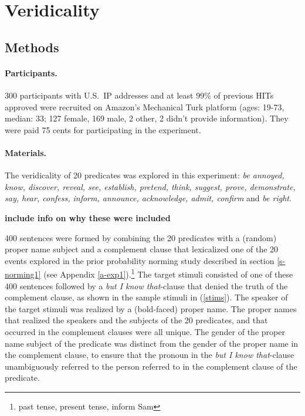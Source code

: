 \documentclass[11pt,fleqn]{article}
\newcommand{\6}{\mbox{$[\hspace*{-.6mm}[$}}
\newcommand{\9}{\mbox{$]\hspace*{-.6mm}]$}}
\begin{document}
\section{Veridicality}\label{s-norming2}

\subsection{Methods}\label{s-methods-2}

\paragraph{Participants.} 300 participants with U.S.\ IP addresses and at least 99\% of previous HITs approved were recruited on Amazon's Mechanical Turk platform (ages: 19-73, median: 33; 127 female, 169 male, 2 other, 2 didn't provide information). They were paid 75 cents for participating in the experiment.

\paragraph{Materials.} The veridicality of 20 predicates was explored in this experiment: {\em be annoyed, know, discover, reveal, see, establish, pretend, think, suggest, prove, demonstrate, say, hear, confess, inform, announce, acknowledge, admit, confirm} and {\em be right}. 

{\bf include info on why these were included}

400 sentences were formed by combining the 20 predicates with a (random) proper name subject and a complement clause that lexicalized one of the 20 events explored in the prior probability norming study described in section \ref{s-norming1} (see Appendix \ref{a-exp1}).\footnote{past tense, present tense, inform Sam} The target stimuli consisted of one of these 400 sentences followed by a {\em but I know that}-clause that denied the truth of the complement clause, as shown in the sample stimuli in (\ref{stims}). The speaker of the target stimuli was realized by a (bold-faced) proper name. The proper names that realized the speakers and the subjects of the 20 predicates, and that occurred in the complement clauses were all unique. The gender of the proper name subject of the predicate was distinct from the gender of the proper name in the complement clause, to ensure that the pronoun in the {\em but I know that}-clause unambiguously referred to the person referred to in the complement clause of the predicate.
\end{document}
